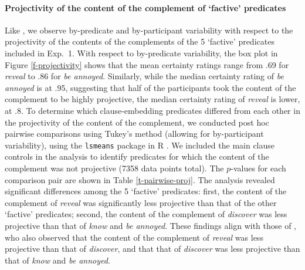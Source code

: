 \documentclass[11pt,fleqn]{article}
\newcommand{\6}{\mbox{$[\hspace*{-.6mm}[$}}
\newcommand{\9}{\mbox{$]\hspace*{-.6mm}]$}}
\begin{document}
\paragraph{Projectivity of the content of the complement of `factive' predicates}  Like \citet{tbd-variability}, we observe by-predicate and by-participant variability with respect to the projectivity of the contents of the complements of  the 5 `factive' predicates included in Exp.~1. With respect to by-predicate variability, the box plot in Figure \ref{f-projectivity} shows that the mean certainty ratings range from .69 for {\em reveal} to .86 for {\em be annoyed}. Similarly, while the median certainty rating of {\em be annoyed} is at .95, suggesting that half of the participants took the content of the complement to be highly projective, the median certainty rating of {\em reveal} is lower, at .8.
To determine which clause-embedding predicates differed from each other in the projectivity of the content of the  complement, we conducted post hoc pairwise comparisons using Tukey's method (allowing for by-participant variability), using the \verb|lsmeans| package \citep{tukey} in R \citep{r}. We included the main clause controls in the analysis to identify predicates for which the content of the complement was not projective (7358 data points total). The $p$-values for each comparison pair are shown in Table \ref{t-pairwise-proj}. The analysis revealed significant differences among the 5 `factive' predicates: first, the content of the complement of {\em reveal} was significantly less projective than that of the other `factive' predicates; second, the content of the complement of {\em discover} was less projective than that of {\em know} and {\em be annoyed}. These findings align with those of \citealt{tbd-variability}, who also observed that the content of the complement of {\em reveal} was less projective than that of {\em discover}, and that that of {\em discover} was less projective than that of {\em know} and {\em be annoyed}.
\end{document}
